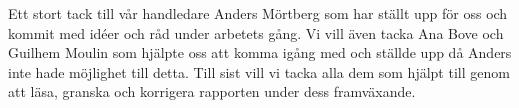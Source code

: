 Ett stort tack till vår handledare Anders Mörtberg som har ställt upp för oss
och kommit med idéer och råd under arbetets gång. Vi vill även tacka Ana Bove
och Guilhem Moulin som hjälpte oss att komma igång med \coq{} och ställde upp
då Anders inte hade möjlighet till detta. Till sist vill vi tacka alla dem som
hjälpt till genom att läsa, granska och korrigera rapporten under dess
framväxande.
